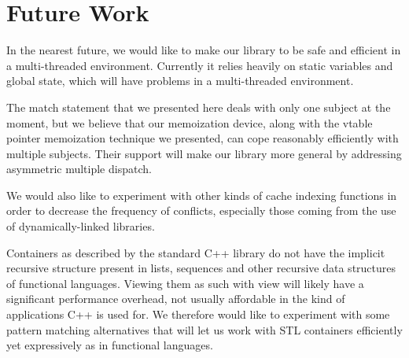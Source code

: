 \section{Future Work} %
\label{sec:fw}

In the nearest future, we would like to make our library to be safe and efficient 
in a multi-threaded environment. Currently it relies heavily on static variables 
and global state, which will have problems in a multi-threaded environment. 

The match statement that we presented here deals with only one subject at the 
moment, but we believe that our memoization device, along with the vtable pointer memoization 
technique we presented, can cope reasonably efficiently with multiple subjects. 
Their support will make our library more general by addressing asymmetric 
multiple dispatch.

We would also like to experiment with other kinds of cache indexing functions in 
order to decrease the frequency of conflicts, especially those coming from the use 
of dynamically-linked libraries.

Containers as described by the standard C++ library do not have the implicit 
recursive structure present in lists, sequences and other recursive data 
structures of functional languages. Viewing them as such with view will likely 
have a significant performance overhead, not usually affordable in the kind of 
applications C++ is used for. We therefore would like to experiment with some 
pattern matching alternatives that will let us work with STL containers 
efficiently yet expressively as in functional languages.
